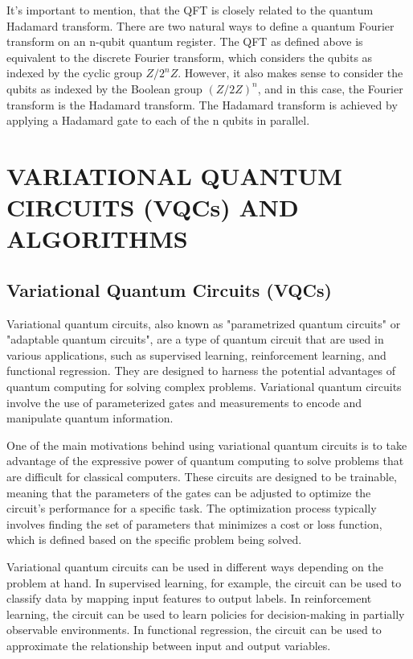 \documentclass[inscr,ack,preface]{diphdthesis}
\begin{document}
It's important to mention, that the QFT is closely related to the quantum Hadamard transform. There are two natural ways to define a quantum Fourier transform on an n-qubit quantum register. The QFT as defined above is equivalent to the discrete Fourier transform, which considers the qubits as indexed by the cyclic group $Z/2^nZ$. However, it also makes sense to consider the qubits as indexed by the Boolean group $(Z/2Z)^n$, and in this case, the Fourier transform is the Hadamard transform. The Hadamard transform is achieved by applying a Hadamard gate to each of the n qubits in parallel.

\chapter{VARIATIONAL QUANTUM CIRCUITS (VQCs) AND ALGORITHMS}

\section{Variational Quantum Circuits (VQCs)}

Variational quantum circuits, also known as "parametrized quantum circuits" or "adaptable quantum circuits", are a type of quantum circuit that are used in various applications, such as supervised learning, reinforcement learning, and functional regression. They are designed to harness the potential advantages of quantum computing for solving complex problems. Variational quantum circuits involve the use of parameterized gates and measurements to encode and manipulate quantum information.

One of the main motivations behind using variational quantum circuits is to take advantage of the expressive power of quantum computing to solve problems that are difficult for classical computers. These circuits are designed to be trainable, meaning that the parameters of the gates can be adjusted to optimize the circuit's performance for a specific task. The optimization process typically involves finding the set of parameters that minimizes a cost or loss function, which is defined based on the specific problem being solved.

Variational quantum circuits can be used in different ways depending on the problem at hand. In supervised learning, for example, the circuit can be used to classify data by mapping input features to output labels. In reinforcement learning, the circuit can be used to learn policies for decision-making in partially observable environments. In functional regression, the circuit can be used to approximate the relationship between input and output variables.
\end{document}
